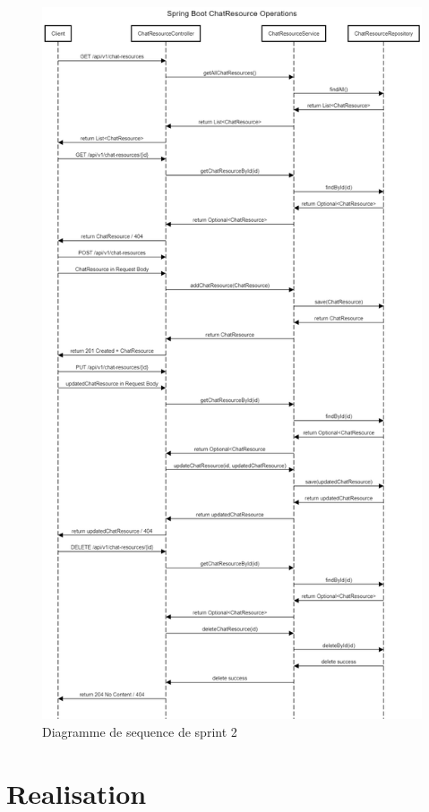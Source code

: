 \documentclass[a4paper, 11pt, openany]{report}
\begin{document}
\begin{figure}[H]
\centering
\includegraphics[width=\textwidth]{chat-res-seq.png} 
\caption{Diagramme de sequence de sprint 2}
\label{fig:chatres_seq}
\end{figure}

\section{Realisation}
\end{document}
